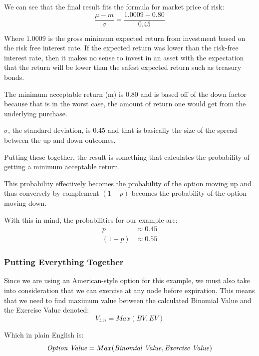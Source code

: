 \documentclass[12pt, letterpaper]{article}
\begin{document}
We can see that the final result fits the formula for market price of risk:
\begin{equation*}
  \frac{\mu - m}{\sigma} = \frac{1.0009 - 0.80}{0.45}
\end{equation*}

Where ${1.0009}$ is the gross minimum expected return from investment based on the risk free interest rate.
If the expected return was lower than the risk-free interest rate, then it makes no sense to invest in an asset with the expectation that the return will be lower than the safest expected return such as treasury bonds.

The minimum acceptable return (m) is ${0.80}$ and is based off of the down factor because that is in the worst case, the amount of return one would get from the underlying purchase.

${\sigma}$, the standard deviation, is ${0.45}$ and that is basically the size of the spread between the up and down outcomes.

Putting these together, the result is something that calculates the probability of getting a minimum acceptable return. %

This probability effectively becomes the probability of the option moving up and thus conversely by complement ${(1-p)}$ becomes the probability of the option moving down.

With this in mind, the probabilities for our example are:
\begin{align*}
  p
  & \approx 0.45
  \\
  (1-p)
  & \approx 0.55
\end{align*}


\subsubsection*{Putting Everything Together}
Since we are using an American-style option for this example, we must also take into consideration that we can exercise at any node before expiration.
This means that we need to find maximum value between the calculated Binomial Value and the Exercise Value denoted:
\begin{equation*}
  V_{t,n} = Max({BV, EV})
\end{equation*}

Which in plain English is:
\begin{equation*}
  \textrm{\textit{Option Value}} = Max(\textrm{\textit{Binomial Value}}, \textrm{\textit{Exercise Value}})
\end{equation*}
\end{document}

